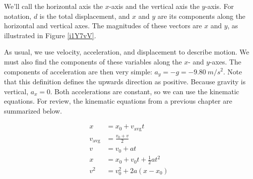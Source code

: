 \documentclass[main-physics.tex]{subfiles}
\begin{document}
\vspace{1em}

We'll call the horizontal axis the $x$-axis and the vertical axis the $y$-axis. For notation, $d$ is the total displacement, and $x$ and $y$ are its components along the horizontal and vertical axes. The magnitudes of these vectors are $x$ and $y$, as illustrated in Figure \ref{i1Y7vV}.

\begin{center}
    \captionsetup{type=figure,margin=1in,font=scriptsize}
    \label{i1Y7vV}
\end{center}

\vspace{1em}

As usual, we use velocity, acceleration, and displacement to describe motion. We must also find the components of these variables along the $x$- and $y$-axes. The components of acceleration are then very simple: $a_y = -g = -\SI{9.80}{m/s^2}$. Note that this definition defines the upwards direction as positive. Because gravity is vertical, $a_x = 0$. Both accelerations are constant, so we can use the kinematic equations. For review, the kinematic equations from a previous chapter are summarized below.

\begin{align}
    x &= x_0 + v_{\text{avg}} t\\[0.5ex]
    v_{\text{avg}} &= \frac{v_0 + v}{2}\\[0.5ex]
    v &= v_0 + a t\\[0.5ex]
    x &= x_0 + v_0 t + \frac{1}{2} a t^2\\[0.5ex]
    v^2 &= v_0^2 + 2 a (x - x_0)
\end{align}
\end{document}
